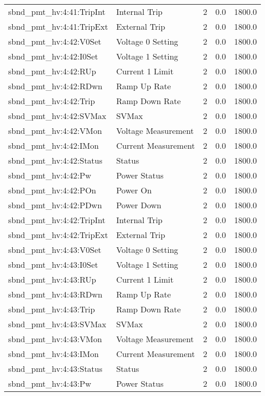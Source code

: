 \begin{center}
\begin{longtable}{l | l l l l }
sbnd\_pmt\_hv:4:41:TripInt & Internal Trip & 2 & 0.0 & 1800.0\\ 
sbnd\_pmt\_hv:4:41:TripExt & External Trip & 2 & 0.0 & 1800.0\\ 
sbnd\_pmt\_hv:4:42:V0Set & Voltage 0 Setting & 2 & 0.0 & 1800.0\\ 
sbnd\_pmt\_hv:4:42:I0Set & Voltage 1 Setting & 2 & 0.0 & 1800.0\\ 
sbnd\_pmt\_hv:4:42:RUp & Current 1 Limit & 2 & 0.0 & 1800.0\\ 
sbnd\_pmt\_hv:4:42:RDwn & Ramp Up Rate & 2 & 0.0 & 1800.0\\ 
sbnd\_pmt\_hv:4:42:Trip & Ramp Down Rate & 2 & 0.0 & 1800.0\\ 
sbnd\_pmt\_hv:4:42:SVMax & SVMax & 2 & 0.0 & 1800.0\\ 
sbnd\_pmt\_hv:4:42:VMon & Voltage Measurement & 2 & 0.0 & 1800.0\\ 
sbnd\_pmt\_hv:4:42:IMon & Current Measurement & 2 & 0.0 & 1800.0\\ 
sbnd\_pmt\_hv:4:42:Status & Status & 2 & 0.0 & 1800.0\\ 
sbnd\_pmt\_hv:4:42:Pw & Power Status & 2 & 0.0 & 1800.0\\ 
sbnd\_pmt\_hv:4:42:POn & Power On & 2 & 0.0 & 1800.0\\ 
sbnd\_pmt\_hv:4:42:PDwn & Power Down & 2 & 0.0 & 1800.0\\ 
sbnd\_pmt\_hv:4:42:TripInt & Internal Trip & 2 & 0.0 & 1800.0\\ 
sbnd\_pmt\_hv:4:42:TripExt & External Trip & 2 & 0.0 & 1800.0\\ 
sbnd\_pmt\_hv:4:43:V0Set & Voltage 0 Setting & 2 & 0.0 & 1800.0\\ 
sbnd\_pmt\_hv:4:43:I0Set & Voltage 1 Setting & 2 & 0.0 & 1800.0\\ 
sbnd\_pmt\_hv:4:43:RUp & Current 1 Limit & 2 & 0.0 & 1800.0\\ 
sbnd\_pmt\_hv:4:43:RDwn & Ramp Up Rate & 2 & 0.0 & 1800.0\\ 
sbnd\_pmt\_hv:4:43:Trip & Ramp Down Rate & 2 & 0.0 & 1800.0\\ 
sbnd\_pmt\_hv:4:43:SVMax & SVMax & 2 & 0.0 & 1800.0\\ 
sbnd\_pmt\_hv:4:43:VMon & Voltage Measurement & 2 & 0.0 & 1800.0\\ 
sbnd\_pmt\_hv:4:43:IMon & Current Measurement & 2 & 0.0 & 1800.0\\ 
sbnd\_pmt\_hv:4:43:Status & Status & 2 & 0.0 & 1800.0\\ 
sbnd\_pmt\_hv:4:43:Pw & Power Status & 2 & 0.0 & 1800.0\\ 

\end{longtable}
\end{center}
